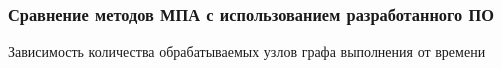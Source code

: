\documentclass[10pt,gray]{beamer}
\begin{document}
\begin{frame}
\frametitle{Сравнение методов МПА с использованием разработанного ПО}
Зависимость количества обрабатываемых узлов графа выполнения от времени
\begin{figure}[h]
  \begin{minipage}[h]{0.49\linewidth}
  \end{minipage}
  \hfill
  \begin{minipage}[h]{0.49\linewidth}
  \end{minipage}
\end{figure}
\end{frame}
\end{document}
